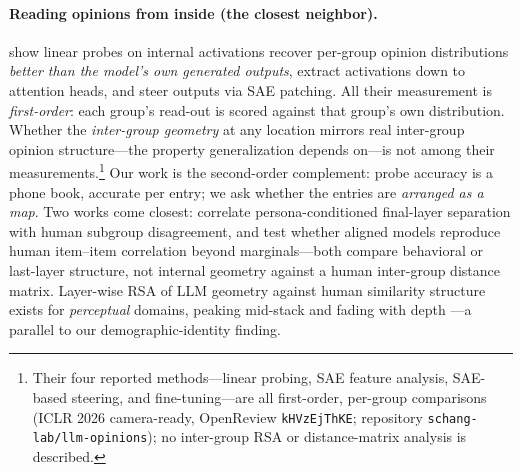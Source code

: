 \paragraph{Reading opinions from inside (the closest neighbor).}
\citet{llmopinions2026} show linear probes on internal activations recover
per-group opinion distributions \emph{better than the model's own
generated outputs}, extract activations down to attention heads, and
steer outputs via SAE patching. All their measurement is
\emph{first-order}: each group's read-out is scored against that group's
own distribution. Whether the \emph{inter-group geometry} at any location
mirrors real inter-group opinion structure---the property generalization
depends on---is not among their measurements.\footnote{Their four reported
methods---linear probing, SAE feature analysis, SAE-based steering, and
fine-tuning---are all first-order, per-group comparisons (ICLR 2026
camera-ready, OpenReview \texttt{kHVzEjThKE}; repository
\texttt{schang-lab/llm-opinions}); no inter-group RSA or distance-matrix
analysis is described.} Our work is
the second-order complement: probe accuracy
is a phone book, accurate per entry; we ask whether the entries are
\emph{arranged as a map}. Two works come closest:
\citet{personamanifold2026}
correlate persona-conditioned final-layer separation with human subgroup
disagreement, and \citet{beyondmarginals2026}
test whether aligned models reproduce human item--item correlation beyond
marginals---both compare behavioral or last-layer structure, not internal
geometry against a human inter-group distance matrix. Layer-wise RSA of
LLM geometry against human similarity structure exists for
\emph{perceptual} domains, peaking
mid-stack and fading with depth \citep{perceptualgeom2026}---a parallel to
our demographic-identity finding.


